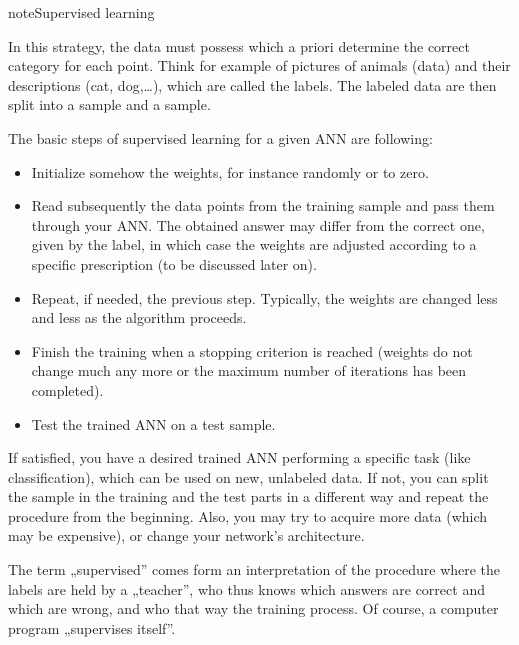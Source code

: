 \documentclass[a4paper,12pt,polish]{jupyterBook}
\begin{document}
\begin{sphinxadmonition}{note}{Supervised learning}

\sphinxAtStartPar
In this strategy, the data must possess  which a priori determine the correct category for each point. Think for example of pictures of animals (data) and their descriptions (cat, dog,…), which are called the labels.
The labeled data are then split into a  sample and a  sample.

\sphinxAtStartPar
The basic steps of supervised learning for a given ANN are following:
\begin{itemize}
\item {} 
\sphinxAtStartPar
Initialize somehow the weights, for instance randomly or to zero.

\item {} 
\sphinxAtStartPar
Read subsequently the data points from the training sample and pass them through your ANN. The obtained answer may differ from the correct one, given by the label, in which case the weights are adjusted according to a specific prescription (to be discussed later on).

\item {} 
\sphinxAtStartPar
Repeat, if needed, the previous step. Typically, the weights are changed less and less as the algorithm proceeds.

\item {} 
\sphinxAtStartPar
Finish the training when a stopping criterion is reached (weights do not change much any more or the maximum number of iterations has been completed).

\item {} 
\sphinxAtStartPar
Test the trained ANN on a test sample.

\end{itemize}

\sphinxAtStartPar
If satisfied, you have a desired trained ANN performing a specific task (like classification), which can be used on new, unlabeled data. If not, you can split the sample in the training and the test parts in a different way and repeat the procedure from the beginning. Also, you may try to acquire more data (which may be expensive), or change your network’s architecture.

\sphinxAtStartPar
The term „supervised” comes form an interpretation of the procedure where the labels are held by a „teacher”, who thus knows which answers are correct and which are wrong, and who  that way the training process. Of course, a computer program „supervises itself”.
\end{sphinxadmonition}
\end{document}
